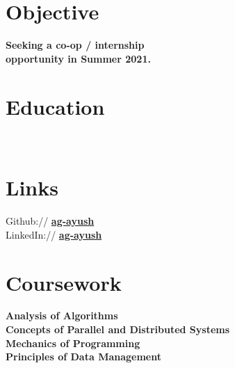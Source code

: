 \documentclass[]{deedy-resume-openfont}
\begin{document}
%
%
\lastupdated

%
%

%
%

\begin{minipage}[t]{0.30\textwidth}


\section{Objective}
\textbf{Seeking a co-op / internship \\
opportunity in Summer 2021.}


\section{Education}

 \\


\section{Links}
Github:// \href{https://github.com/ayush}{\bf ag-ayush} \\
LinkedIn://  \href{https://www.linkedin.com/in/ag-ayush}{\bf ag-ayush} \\


\section{Coursework}
\textbf{Analysis of Algorithms \\
Concepts of Parallel and Distributed Systems \\
Mechanics of Programming \\
Principles of Data Management \\
}


\end{minipage}
\end{document}
